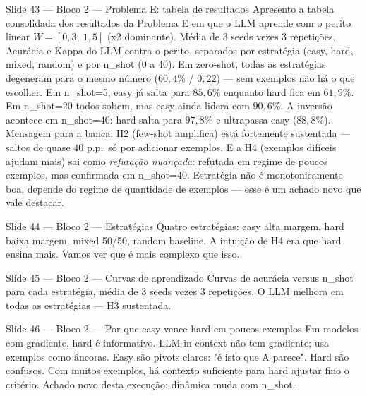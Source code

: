 \documentclass[aspectratio=169,10pt]{beamer}
\begin{document}
\begin{frame}{Slide 43 --- Bloco 2 --- Problema E: tabela de resultados}
\footnotesize
Apresento a tabela consolidada dos resultados da Problema E em que o LLM aprende com o perito linear $W=[0{,}3,\ 1{,}5]$ (x2 dominante). M\'edia de 3 seeds vezes 3 repeti\c{c}\~oes. Acur\'acia e Kappa do LLM contra o perito, separados por estrat\'egia (easy, hard, mixed, random) e por n\_shot (0 a 40). Em zero-shot, todas as estrat\'egias degeneram para o mesmo n\'umero ($60{,}4\%$ / $0{,}22$) --- sem exemplos n\~ao h\'a o que escolher. Em n\_shot=5, easy j\'a salta para $85{,}6\%$ enquanto hard fica em $61{,}9\%$. Em n\_shot=20 todos sobem, mas easy ainda lidera com $90{,}6\%$. A invers\~ao acontece em n\_shot=40: hard salta para $97{,}8\%$ e ultrapassa easy ($88{,}8\%$). Mensagem para a banca: H2 (few-shot amplifica) est\'a fortemente sustentada --- saltos de quase $40$ p.p.\ s\'o por adicionar exemplos. E a H4 (exemplos dif\'iceis ajudam mais) sai como \emph{refuta\c{c}\~ao nuan\c{c}ada}: refutada em regime de poucos exemplos, mas confirmada em n\_shot=40. Estrat\'egia n\~ao \'e monotonicamente boa, depende do regime de quantidade de exemplos --- esse \'e um achado novo que vale destacar.
\end{frame}

\begin{frame}{Slide 44 --- Bloco 2 --- Estrat\'egias}
\footnotesize
Quatro estrat\'egias: easy alta margem, hard baixa margem, mixed 50/50, random baseline. A intui\c{c}\~ao de H4 era que hard ensina mais. Vamos ver que \'e mais complexo que isso.
\end{frame}

\begin{frame}{Slide 45 --- Bloco 2 --- Curvas de aprendizado}
\footnotesize
Curvas de acur\'acia versus n\_shot para cada estrat\'egia, m\'edia de 3 seeds vezes 3 repeti\c{c}\~oes. O LLM melhora em todas as estrat\'egias --- H3 sustentada.
\end{frame}

\begin{frame}{Slide 46 --- Bloco 2 --- Por que easy vence hard em poucos exemplos}
\footnotesize
Em modelos com gradiente, hard \'e informativo. LLM in-context n\~ao tem gradiente; usa exemplos como \^ancoras. Easy s\~ao pivots claros: "\'e isto que A parece". Hard s\~ao confusos. Com muitos exemplos, h\'a contexto suficiente para hard ajustar fino o crit\'erio. Achado novo desta execu\c{c}\~ao: din\^amica muda com n\_shot.
\end{frame}
\end{document}
